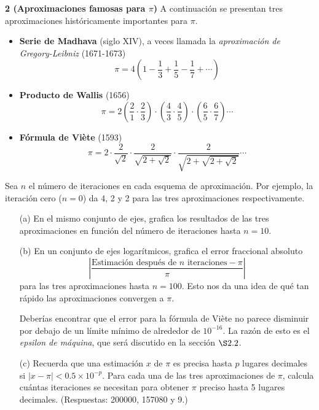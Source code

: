 \documentclass{article}
\begin{document}
\textbf{2 (Aproximaciones famosas para \(\pi\))} A continuación se presentan tres aproximaciones históricamente importantes para \(\pi\).

\begin{itemize}
    \item \textbf{Serie de Madhava} (siglo XIV), a veces llamada la \textit{aproximación de Gregory-Leibniz} (1671-1673)
    \[
    \pi = 4 \left( 1 - \frac{1}{3} + \frac{1}{5} - \frac{1}{7} + \cdots \right)
    \]
    
    \item \textbf{Producto de Wallis} (1656)
    \[
    \pi = 2 \left( \frac{2}{1} \cdot \frac{2}{3} \right) \cdot \left( \frac{4}{3} \cdot \frac{4}{5} \right) \cdot \left( \frac{6}{5} \cdot \frac{6}{7} \right) \cdots
    \]
    
    \item \textbf{Fórmula de Viète} (1593)
    \[
    \pi = 2 \cdot \frac{2}{\sqrt{2}} \cdot \frac{2}{\sqrt{2 + \sqrt{2}}} \cdot \frac{2}{\sqrt{2 + \sqrt{2 + \sqrt{2}}}} \cdots
    \]
\end{itemize}

Sea \(n\) el número de iteraciones en cada esquema de aproximación. Por ejemplo, la iteración cero (\(n = 0\)) da 4, 2 y 2 para las tres aproximaciones respectivamente.

\begin{itemize}
    \item[(a)] En el mismo conjunto de ejes, grafica los resultados de las tres aproximaciones en función del número de iteraciones hasta \(n = 10\).
    
    \item[(b)] En un conjunto de ejes logarítmicos, grafica el error fraccional absoluto
    \[
    \left| \frac{\text{Estimación después de } n \text{ iteraciones} - \pi}{\pi} \right|
    \]
    para las tres aproximaciones hasta \(n = 100\). Esto nos da una idea de qué tan rápido las aproximaciones convergen a \(\pi\).
    
    Deberías encontrar que el error para la fórmula de Viète no parece disminuir por debajo de un límite mínimo de alrededor de \(10^{-16}\). La razón de esto es el \textit{epsilon de máquina}, que será discutido en la sección \(\S 2.2\).
    
    \item[(c)] Recuerda que una estimación \(x\) de \(\pi\) es precisa hasta \(p\) lugares decimales si \(\left| x - \pi \right| < 0.5 \times 10^{-p}\). Para cada una de las tres aproximaciones de \(\pi\), calcula cuántas iteraciones se necesitan para obtener \(\pi\) preciso hasta 5 lugares decimales. (Respuestas: 200000, 157080 y 9.)
\end{itemize}
\end{document}
